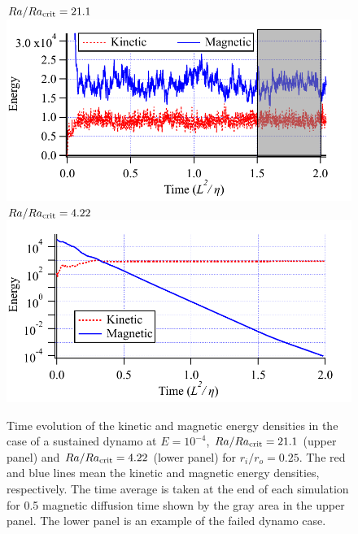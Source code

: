 \begin{figure}
\begin{center}
$Ra / Ra_{\rm crit} = 21.1$ \\
\includegraphics*[width=120mm]{Figures/sph_shell_383_ene.pdf} \\
$Ra / Ra_{\rm crit} = 4.22$ \\
\includegraphics*[width=120mm]{Figures/sph_shell_389_ene.pdf}
\end{center}
\caption{
Time evolution of the kinetic and magnetic energy densities in the case of a sustained dynamo at $E = 10^{-4}$, $Ra / Ra_{\rm crit} = 21.1$ (upper panel) and $Ra / Ra_{\rm crit} = 4.22$ (lower panel) for $r_{i} / r_{o} = 0.25$. The red and blue lines mean the kinetic and magnetic energy densities, respectively. The time average is taken at the end of each simulation for 0.5 magnetic diffusion time shown by the gray area in the upper panel. The lower panel is an example of the failed dynamo case.
}
\label{fig:fig_2}
\end{figure}